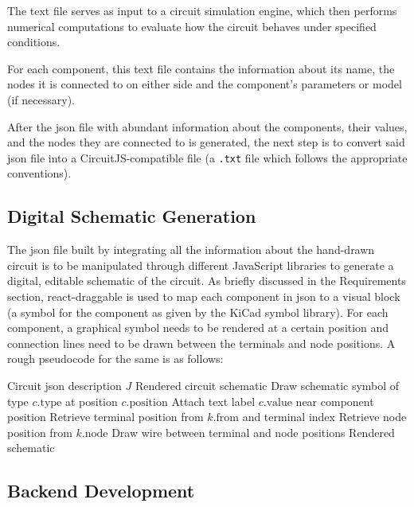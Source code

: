 The text file serves as input to a circuit simulation engine, which then performs numerical computations to evaluate how the circuit behaves under specified conditions.

For each component, this text file contains the information about its name, the nodes it is connected to on either side and the component's parameters or model (if necessary).

After the \gls{json} file with abundant information about the components, their values, and the nodes they are connected to is generated, the next step is to convert said \gls{json} file into a CircuitJS-compatible file (a \texttt{.txt} file which follows the appropriate conventions).

\subsection{Digital Schematic Generation}

The \gls{json} file built by integrating all the information about the hand-drawn circuit is to be manipulated through different JavaScript libraries to generate a digital, editable schematic of the circuit. As briefly discussed in the Requirements section, react-draggable is used to map each component in \gls{json} to a visual block (a symbol for the component as given by the KiCad symbol library). For each component, a graphical symbol needs to be rendered at a certain position and connection lines need to be drawn between the terminals and node positions. A rough pseudocode for the same is as follows:

\begin{algorithm}
\caption{Frontend Circuit Rendering}
\label{algo:frontend-rendering}
\begin{algorithmic}
\Require Circuit \gls{json} description $J$
\Ensure Rendered circuit schematic
    \State Draw schematic symbol of type $c.\text{type}$ at position $c.\text{position}$
    \State Attach text label $c.\text{value}$ near component position
\EndFor
{}
    \State Retrieve terminal position from $k.\text{from}$ and terminal index
    \State Retrieve node position from $k.\text{node}$
    \State Draw wire between terminal and node positions
\EndFor
\State \Return Rendered schematic
\end{algorithmic}
\end{algorithm}

\subsection{Backend Development}


